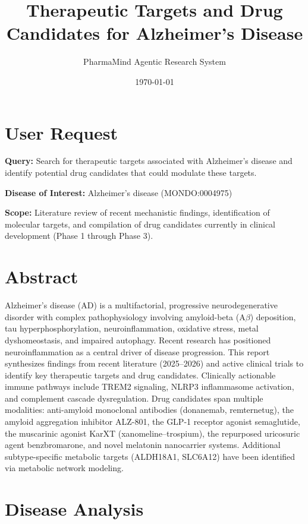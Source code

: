 \documentclass[11pt, a4paper]{article}
\title{Therapeutic Targets and Drug Candidates for Alzheimer's Disease}
\author{PharmaMind Agentic Research System}
\date{\today}
\begin{document}
\maketitle
\tableofcontents
\newpage

\section{User Request}
\label{sec:request}

\textbf{Query:} Search for therapeutic targets associated with Alzheimer's disease and identify potential drug candidates that could modulate these targets.

\textbf{Disease of Interest:} Alzheimer's disease (MONDO:0004975)

\textbf{Scope:} Literature review of recent mechanistic findings, identification of molecular targets, and compilation of drug candidates currently in clinical development (Phase 1 through Phase 3).

\section{Abstract}
\label{sec:abstract}

Alzheimer's disease (AD) is a multifactorial, progressive neurodegenerative disorder with complex pathophysiology involving amyloid-beta (A$\beta$) deposition, tau hyperphosphorylation, neuroinflammation, oxidative stress, metal dyshomeostasis, and impaired autophagy. Recent research has positioned neuroinflammation as a central driver of disease progression. This report synthesizes findings from recent literature (2025--2026) and active clinical trials to identify key therapeutic targets and drug candidates. Clinically actionable immune pathways include TREM2 signaling, NLRP3 inflammasome activation, and complement cascade dysregulation. Drug candidates span multiple modalities: anti-amyloid monoclonal antibodies (donanemab, remternetug), the amyloid aggregation inhibitor ALZ-801, the GLP-1 receptor agonist semaglutide, the muscarinic agonist KarXT (xanomeline--trospium), the repurposed uricosuric agent benzbromarone, and novel melatonin nanocarrier systems. Additional subtype-specific metabolic targets (ALDH18A1, SLC6A12) have been identified via metabolic network modeling.

\section{Disease Analysis}
\label{sec:disease}
\end{document}
